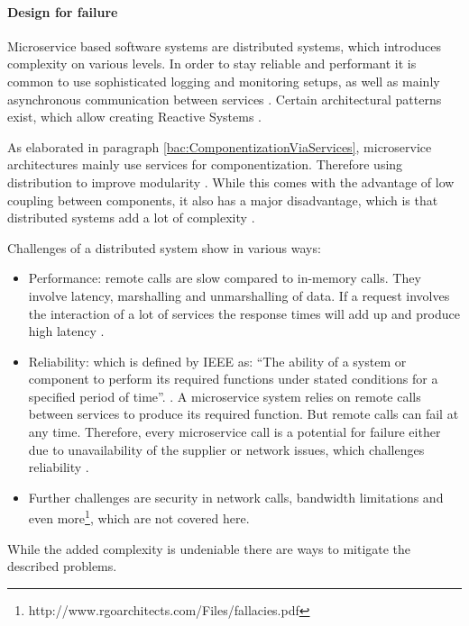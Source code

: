 \paragraph{Design for failure}
\label{bac:DesignForFailure}
Microservice based software systems are distributed systems, which introduces complexity on various levels. In order to stay reliable and performant it is common to use sophisticated logging and monitoring setups, as well as mainly asynchronous communication between services \cite{FowlerDesignForFailure2014}.
Certain architectural patterns exist, which allow creating Reactive Systems \citep{Reactive2014} \citep[p. 207-209]{Wolff2016}.

As elaborated in paragraph \ref{bac:ComponentizationViaServices}, microservice architectures mainly use services for componentization.
Therefore using distribution to improve modularity \cite{FowlerTradeoffsDistribution2015}.
While this comes with the advantage of low coupling between components, it also has a major disadvantage, which is that distributed systems add a lot of complexity \cite{FowlerTradeoffsDistribution2015}.

Challenges of a distributed system show in various ways:
\begin{itemize}
\item Performance: remote calls are slow compared to in-memory calls. They involve latency, marshalling and unmarshalling of data. 
If a request involves the interaction of a lot of services the response times will add up and produce high latency \cite{FowlerTradeoffsDistribution2015}.
\item Reliability: which is defined by IEEE as:
``The ability of a system or component to perform its required functions under stated conditions for a specified period of time''. \cite{Rosenberg1998}.
A microservice system relies on remote calls between services to produce its required function.
But remote calls can fail at any time.
Therefore, every microservice call is a potential for failure either due to unavailability of the supplier or network issues, which challenges reliability \cite{FowlerDesignForFailure2014}.
\item Further challenges are security in network calls, bandwidth limitations and even more\footnote{http://www.rgoarchitects.com/Files/fallacies.pdf}, which are not covered here.
\end{itemize}

While the added complexity is undeniable there are ways to mitigate the described problems.

